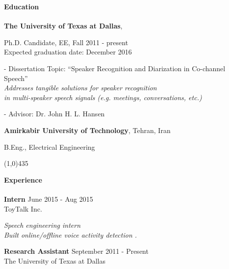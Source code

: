 \documentclass[doublespacing]{utdthesis}
\begin{document}
\begin{vita}
\textbf{\sc Education\\\\}
{\bf The University of Texas at Dallas}, \\
\vspace*{-.1in}
\begin{list1}
	\item[] Ph.D. Candidate, EE, Fall 2011 - present \\
	Expected graduation date: December 2016
	\begin{list2}
		\vspace*{0.in}
		\item[-]Dissertation Topic:  ``Speaker Recognition and Diarization in Co-channel Speech'' \\
		{\it Addresses tangible solutions for speaker recognition \\in multi-speaker speech signals (e.g. meetings, conversations, etc.) }
		\item[-]Advisor:  Dr. John H. L. Hansen
	\end{list2}
\end{list1}
\vspace{3mm}
{\bf Amirkabir University of Technology}, Tehran, Iran\\
\vspace*{-.1in}
\begin{list1}
	\item[] B.Eng., Electrical Engineering
\end{list1}
\vspace{0mm}
\line(1,0){435}


\textbf{\sc Experience\\\\}
{\bf Intern} \hfill {June 2015 - Aug 2015}\\
ToyTalk Inc.
\begin{list1}
	\item[] {\it Speech engineering intern \\Built online/offline voice activity detection
		.}
	\vspace{2mm}
\end{list1}



{\bf Research Assistant} \hfill {September 2011 - Present}\\
The University of Texas at Dallas


\end{vita}
\end{document}
